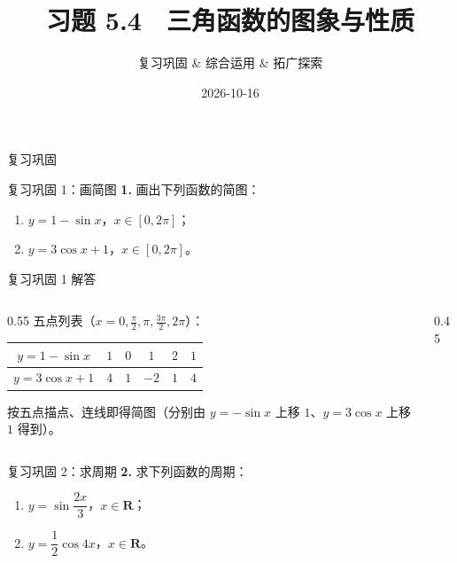 \documentclass[10pt,aspectratio=169,serif]{beamer}
\title[习题5.4]{习题 5.4　三角函数的图象与性质}
\subtitle{复习巩固 \& 综合运用 \& 拓广探索}
\author{}
\institute{}
\date{2026-10-16}
\begin{document}
\begin{frame}
  \titlepage
\end{frame}

\begin{frame}[c]\Huge\centering 复习巩固\end{frame}

\begin{frame}[t]{复习巩固 1：画简图}
\textbf{1.} 画出下列函数的简图：
\begin{enumerate}[(1)]
  \item $y=1-\sin x$，$x\in[0,2\pi]$； \qquad
  \item $y=3\cos x+1$，$x\in[0,2\pi]$。
\end{enumerate}
\end{frame}

\begin{frame}[t]{复习巩固 1 解答}
\begin{columns}
\begin{column}{0.55\textwidth}
\small
五点列表（$x=0,\frac\pi2,\pi,\frac{3\pi}{2},2\pi$）：
\begin{tabular}{c|ccccc}
$y=1-\sin x$ & $1$ & $0$ & $1$ & $2$ & $1$\\
\hline
$y=3\cos x+1$ & $4$ & $1$ & $-2$ & $1$ & $4$\\
\end{tabular}
\vspace{0.5em}
\small
按五点描点、连线即得简图（分别由 $y=-\sin x$ 上移 $1$、$y=3\cos x$ 上移 $1$ 得到）。
\end{column}
\begin{column}{0.45\textwidth}
\end{column}
\end{columns}
\end{frame}

\begin{frame}[t]{复习巩固 2：求周期}
\textbf{2.} 求下列函数的周期：
\begin{enumerate}[(1)]
  \item $y=\sin\dfrac{2x}{3}$，$x\in\mathbf R$； \qquad
  \item $y=\dfrac12\cos 4x$，$x\in\mathbf R$。
\end{enumerate}
\end{frame}
\end{document}

